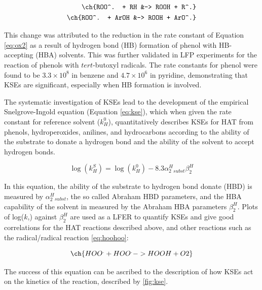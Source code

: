 \begin{align}
  \ch{ROO^. + RH &-> ROOH + R^.} \label{eq:ox1} \\
  \ch{ROO^. + ArOH &-> ROOH +  ArO^.} \label{eq:ox2}
\end{align}

\noindent This change was attributed to the reduction in the rate constant of
Equation \ref{eq:ox2} as a result of hydrogen bond (HB) formation of phenol with
HB-accepting (HBA) solvents. This was further validated in LFP
experiments\cite{Das1981} for the reaction of phenols with $tert$-butoxyl
radicals. The rate constants for phenol were found to be $3.3 \times 10^8$ \Ms
in benzene and $4.7 \times 10^6$ \Ms in pyridine, demonstrating that KSEs are
significant, especially when HB formation is involved.

The systematic investigation of KSEs lead to the development of the empirical
Snelgrove-Ingold equation\cite{Snelgrove2001,Litwinienko2007} (Equation
\ref{eq:kse}), which when given the rate constant for reference solvent ($k^0_H$),
quantitatively describes KSEs for HAT from phenols, hydroperoxides, anilines,
and hydrocarbons according to the ability of the substrate to donate a hydrogen
bond and the ability of the solvent to accept hydrogen bonds.

\begin{equation}
  \log(k_H^S) = \log(k_H^0) - 8.3\alpha_2^H_{subst}\beta_2^H
  \label{eq:kse}
\end{equation}

\noindent In this equation, the ability of the substrate to hydrogen bond donate
(HBD) is measured by $\alpha_2^H_{subst}$, the so called Abraham HBD
parameters,\cite{Abraham1989} and the HBA capability of the solvent in measured
by the Abraham HBA parameters $\beta_2^H$.\cite{Abraham1990} Plots of
log($k$,\Ms) against $\beta_2^H$ are used as a LFER to quantify KSEs and give
good correlations for the HAT reactions described above, and other reactions
such as the radical/radical reaction \ref{eq:hoohoo}:\cite{Foti2005}

\begin{equation}
  \ch{HOO^. + HOO^. -> HOOH + O2}
  \label{eq:hoohoo}
\end{equation}

The success of this equation can be ascribed to the description of how KSEs act
on the kinetics of the reaction, described by \ref{fig:kse}.

